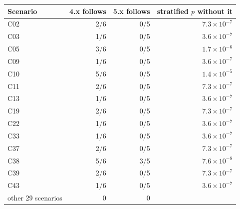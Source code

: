 \begin{tabular}{@{}lrrr@{}}\toprule
Scenario & 4.x follows & 5.x follows & stratified $p$ without it\\\midrule
C02 & 2/6 & 0/5 & $7.3\times 10^{-7}$\\
C03 & 1/6 & 0/5 & $3.6\times 10^{-7}$\\
C05 & 3/6 & 0/5 & $1.7\times 10^{-6}$\\
C09 & 1/6 & 0/5 & $3.6\times 10^{-7}$\\
C10 & 5/6 & 0/5 & $1.4\times 10^{-5}$\\
C11 & 2/6 & 0/5 & $7.3\times 10^{-7}$\\
C13 & 1/6 & 0/5 & $3.6\times 10^{-7}$\\
C19 & 2/6 & 0/5 & $7.3\times 10^{-7}$\\
C22 & 1/6 & 0/5 & $3.6\times 10^{-7}$\\
C33 & 1/6 & 0/5 & $3.6\times 10^{-7}$\\
C37 & 2/6 & 0/5 & $7.3\times 10^{-7}$\\
C38 & 5/6 & 3/5 & $7.6\times 10^{-8}$\\
C39 & 2/6 & 0/5 & $7.3\times 10^{-7}$\\
C43 & 1/6 & 0/5 & $3.6\times 10^{-7}$\\
\midrule other 29 scenarios & 0 & 0 & \\
\bottomrule
\end{tabular}
